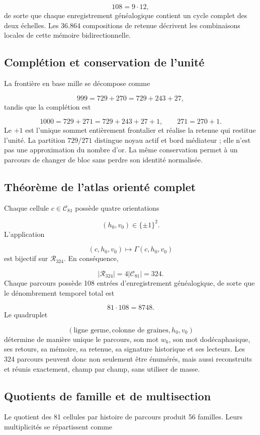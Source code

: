 \[
 108=9\cdot12,
\]
de sorte que chaque enregistrement généalogique contient un cycle complet des deux échelles. Les 36.864 compositions de retenue décrivent les combinaisons locales de cette mémoire bidirectionnelle.

\subsection{Complétion et conservation de l'unité}
La frontière en base mille se décompose comme

\[
 999=729+270=729+243+27,
\]
tandis que la complétion est

\[
 1000=729+271=729+243+27+1,
\qquad
 271=270+1.
\]
Le \(+1\) est l'unique sommet entièrement frontalier et réalise la retenue qui restitue l'unité. La partition \(729/271\) distingue noyau actif et bord médiateur ; elle n'est pas une approximation du nombre d'or. La même conservation permet à un parcours de changer de bloc sans perdre son identité normalisée.

\subsection{Théorème de l'atlas orienté complet}
Chaque cellule \(c\in\mathcal C_{81}\) possède quatre orientations

\[
 (h_0,v_0)\in\{\pm1\}^2.
\]
L’application

\[
 (c,h_0,v_0)\longmapsto\Gamma(c,h_0,v_0)
\]
est bijectif sur \(\mathcal R_{324}\). En conséquence,

\[
 |\mathcal R_{324}|=4|\mathcal C_{81}|=324.
\]
Chaque parcours possède 108 entrées d'enregistrement généalogique, de sorte que le dénombrement temporel total est

\[
 81\cdot108=8748.
\]
Le quadruplet

\[
 (\text{ligne germe},\text{colonne de graines},h_0,v_0)
\]
détermine de manière unique le parcours, son mot \(w_6\), son mot dodécaphasique, ses retours, sa mémoire, sa retenue, sa signature historique et ses lecteurs. Les 324 parcours peuvent donc non seulement être énumérés, mais aussi reconstruits et réunis exactement, champ par champ, sans utiliser de masse.

\subsection{Quotients de famille et de multisection}
Le quotient des 81 cellules par histoire de parcours produit 56 familles. Leurs multiplicités se répartissent comme

